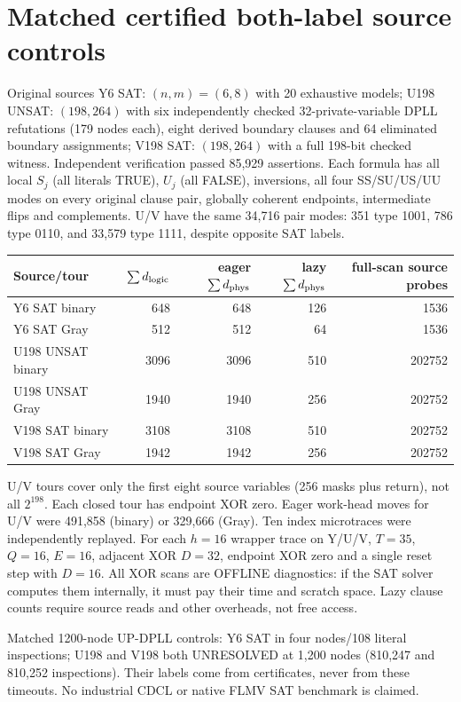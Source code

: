 \documentclass[10pt]{article}
\begin{document}
\section{Matched certified both-label source controls}
Original sources Y6 SAT: $(n,m)=(6,8)$ with 20 exhaustive models; U198 UNSAT: $(198,264)$ with six independently checked 32-private-variable DPLL refutations (179 nodes each), eight derived boundary clauses and 64 eliminated boundary assignments; V198 SAT: $(198,264)$ with a full 198-bit checked witness. Independent verification passed 85,929 assertions. Each formula has all local $S_j$ (all literals TRUE), $U_j$ (all FALSE), inversions, all four SS/SU/US/UU modes on every original clause pair, globally coherent endpoints, intermediate flips and complements. U/V have the same 34,716 pair modes: 351 type 1001, 786 type 0110, and 33,579 type 1111, despite opposite SAT labels.

\begin{center}\small\begin{tabular}{lrrrr}
\toprule
Source/tour & $\sum d_{\rm logic}$ & eager $\sum d_{\rm phys}$ & lazy $\sum d_{\rm phys}$ & full-scan source probes\\ \midrule
Y6 SAT binary&648&648&126&1536\\
Y6 SAT Gray&512&512&64&1536\\
U198 UNSAT binary&3096&3096&510&202752\\
U198 UNSAT Gray&1940&1940&256&202752\\
V198 SAT binary&3108&3108&510&202752\\
V198 SAT Gray&1942&1942&256&202752\\\bottomrule
\end{tabular}\end{center}
U/V tours cover only the first eight source variables (256 masks plus return), not all $2^{198}$. Each closed tour has endpoint XOR zero. Eager work-head moves for U/V were 491,858 (binary) or 329,666 (Gray). Ten index microtraces were independently replayed. For each $h=16$ wrapper trace on Y/U/V, $T=35$, $Q=16$, $E=16$, adjacent XOR $D=32$, endpoint XOR zero and a single reset step with $D=16$. All XOR scans are OFFLINE diagnostics: if the SAT solver computes them internally, it must pay their time and scratch space. Lazy clause counts require source reads and other overheads, not free access.

Matched 1200-node UP-DPLL controls: Y6 SAT in four nodes/108 literal inspections; U198 and V198 both UNRESOLVED at 1,200 nodes (810,247 and 810,252 inspections). Their labels come from certificates, never from these timeouts. No industrial CDCL or native FLMV SAT benchmark is claimed.
\end{document}
